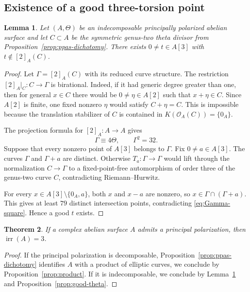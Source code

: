 \documentclass[12pt]{amsart}
\numberwithin{equation}{section}
\newtheorem{theorem}{Theorem}[section]
\newtheorem{lemma}[theorem]{Lemma}
\theoremstyle{definition}
\theoremstyle{remark}
\newcommand{\cO}{\mathcal O}
\newcommand{\irr}{\operatorname{irr}}
\begin{document}
\subsection{Existence of a good three-torsion point}

\begin{lemma}\label{lem:good-point}
Let $(A,\Theta)$ be an indecomposable principally polarized abelian
surface and let $C\subset A$ be the symmetric genus-two theta divisor from
Proposition~\ref{prop:ppas-dichotomy}.  There exists
$0\neq t\in A[3]$ with $t\notin[2]_A(C)$.
\end{lemma}

\begin{proof}
Let $\Gamma=[2]_A(C)$ with its reduced curve structure.  The restriction
$[2]_A|_C:C\to\Gamma$ is birational.  Indeed, if it had generic degree
greater than one, then for general $x\in C$ there would be
$0\neq\eta\in A[2]$ such that $x+\eta\in C$.  Since $A[2]$ is finite,
one fixed nonzero $\eta$ would satisfy $C+\eta=C$.  This is impossible
because the translation stabilizer of $C$ is contained in
$K(\cO_A(C))=\{0_A\}$.

The projection formula for
$[2]_A:A\to A$ gives
\begin{equation}
  \Gamma\equiv4\Theta,\qquad \Gamma^2=32.
\label{eq:Gamma-square}
\end{equation}
Suppose that every nonzero point of $A[3]$ belongs to $\Gamma$.  Fix
$0\neq a\in A[3]$.  The curves $\Gamma$ and $\Gamma+a$ are distinct.
Otherwise $T_a:\Gamma\to\Gamma$ would lift through the normalization
$C\to\Gamma$ to a fixed-point-free automorphism of order three of the
genus-two curve $C$, contradicting Riemann--Hurwitz.

For every $x\in A[3]\setminus\{0_A,a\}$, both $x$ and $x-a$ are
nonzero, so
$x\in\Gamma\cap(\Gamma+a)$.  This gives at least $79$ distinct
intersection points, contradicting
\eqref{eq:Gamma-square}.  Hence a good $t$ exists.
\end{proof}

\begin{theorem}\label{thm:type11}
If a complex abelian surface $A$ admits a principal polarization, then
$\irr(A)=3$.
\end{theorem}

\begin{proof}
If the principal polarization is decomposable,
Proposition~\ref{prop:ppas-dichotomy} identifies $A$ with a product of
elliptic curves, we conclude by Proposition~\ref{prop:product}.  If it is indecomposable,  we conclude by Lemma~\ref{lem:good-point}
and Proposition~\ref{prop:good-theta}.
\end{proof}
\end{document}
